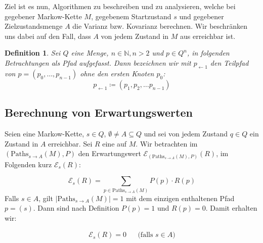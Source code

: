 \documentclass[a4paper]{article}
\newcommand{\mc}{Markow-Kette}
\newtheorem{definition}[satz]{Definition} %
\theoremstyle{nonumberplain}
\begin{document}
Ziel ist es nun, Algorithmen zu beschreiben und zu analysieren, welche bei gegebener \mc{} $M$, gegebenem Startzustand $s$ und gegebener Zielzustandsmenge $A$ die Varianz bzw. Kovarianz berechnen. Wir beschränken uns dabei auf den Fall, dass $A$ von jedem Zustand in $M$ aus erreichbar ist.

\begin{definition}
	Sei $Q$ eine Menge, $n\in \mathbb{N}, n>2$ und $p \in Q^n$, in folgenden Betrachtungen als Pfad aufgefasst. Dann bezeichnen wir mit $p_{\leftarrow 1}$ den Teilpfad von $p = (p_0, \dots, p_{n-1})$ ohne den ersten Knoten $p_0$:
	\begin{equation}
		p_{\leftarrow 1} \coloneqq (p_1,p_2, \dots p_{n-1})
	\end{equation}
\end{definition}

\subsection{Berechnung von Erwartungswerten}

Seien \mcex{} eine \mc{}, $s \in Q$, $\emptyset \neq A \subseteq Q$ und sei von jedem Zustand $q\in Q$ ein Zustand in $A$ erreichbar. Sei $R$ eine \reward{} auf $M$. Wir betrachten im \probspacen{} $(\mathrm{Paths}_{s \rightarrow A}(M), P)$ den Erwartungswert $\mathcal{E}_{(\mathrm{Paths}_{s \rightarrow A}(M), P)}(R)$, im Folgenden kurz $\mathcal{E}_{s}(R)$:

\begin{equation}
	\mathcal{E}_{s}(R) = \sum_{p \in \mathrm{Paths}_{s \rightarrow A}(M)}{P(p) \cdot R(p)} 
\end{equation}
Falls $s \in A$, gilt $|\mathrm{Paths}_{s \rightarrow A}(M)| = 1$ mit dem einzigen enthaltenen Pfad $p = (s)$. Dann sind nach Definition $P(p) = 1$ und $R(p) = 0$. Damit erhalten wir:

\begin{align}
	\mathcal{E}_{s}(R) = 0 && \text{(falls $s \in A$)}\label{expect_trivial}
\end{align}
\end{document}
